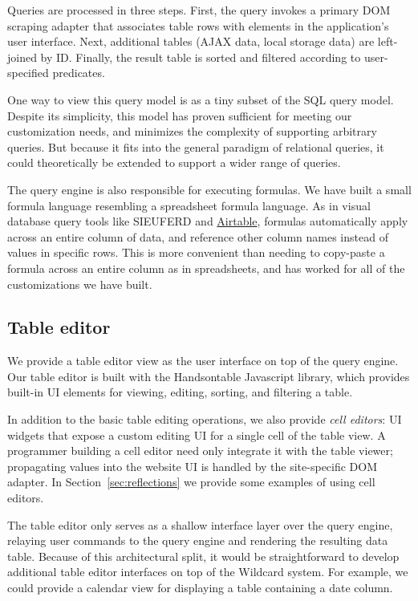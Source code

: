 \documentclass[sigplan,screen,10pt,anonymous,review]{acmart}
\begin{document}
Queries are processed in three steps. First, the query invokes a primary
DOM scraping adapter that associates table rows with elements in the
application's user interface. Next, additional tables (AJAX data, local
storage data) are left-joined by ID. Finally, the result table is sorted
and filtered according to user-specified predicates.

One way to view this query model is as a tiny subset of the SQL query
model. Despite its simplicity, this model has proven sufficient for
meeting our customization needs, and minimizes the complexity of
supporting arbitrary queries. But because it fits into the general
paradigm of relational queries, it could theoretically be extended to
support a wider range of queries.

The query engine is also responsible for executing formulas. We have
built a small formula language resembling a spreadsheet formula
language. As in visual database query tools like SIEUFERD
\citep{bakke2016} and \href{https://airtable.com/}{Airtable}, formulas
automatically apply across an entire column of data, and reference other
column names instead of values in specific rows. This is more convenient
than needing to copy-paste a formula across an entire column as in
spreadsheets, and has worked for all of the customizations we have
built.

\hypertarget{table-editor}{%
\subsection{Table editor}\label{table-editor}}

We provide a table editor view as the user interface on top of the query
engine. Our table editor is built with the Handsontable Javascript
library, which provides built-in UI elements for viewing, editing,
sorting, and filtering a table.

In addition to the basic table editing operations, we also provide
\emph{cell editors}: UI widgets that expose a custom editing UI for a
single cell of the table view. A programmer building a cell editor need
only integrate it with the table viewer; propagating values into the
website UI is handled by the site-specific DOM adapter. In
Section~\ref{sec:reflections} we provide some examples of using cell
editors.

The table editor only serves as a shallow interface layer over the query
engine, relaying user commands to the query engine and rendering the
resulting data table. Because of this architectural split, it would be
straightforward to develop additional table editor interfaces on top of
the Wildcard system. For example, we could provide a calendar view for
displaying a table containing a date column.
\end{document}
